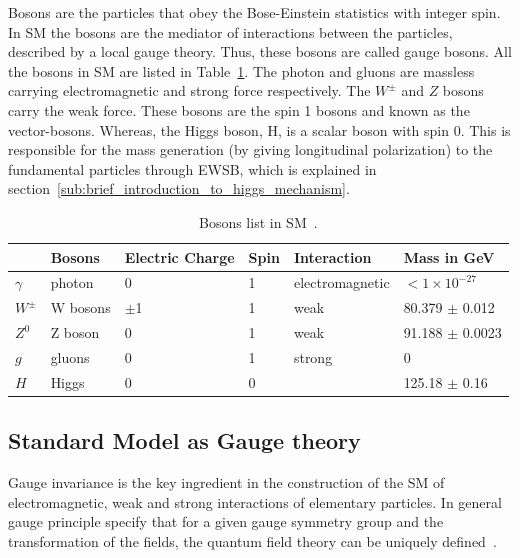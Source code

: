 Bosons are the particles that obey the Bose-Einstein statistics with integer spin. In SM the bosons are the mediator of interactions between the particles, described by a local gauge theory. Thus, these bosons are called gauge bosons. All the bosons in SM are listed in Table~\ref{table:smbosons}.
The photon and gluons are massless carrying electromagnetic and strong force respectively. The $W^{\pm}$ and $Z$ bosons carry the weak force. These bosons are the spin 1 bosons and known as the vector-bosons. Whereas, the Higgs boson, H, is a scalar boson with spin 0. This is responsible for the mass generation (by giving longitudinal polarization) to the fundamental particles through EWSB, which is explained in section~\ref{sub:brief_introduction_to_higgs_mechanism}.

\begin{table}
{\small
\centering
\begin{tabular}[!htbp]{l l l l l l}
\hline
    & \textbf{Bosons} & \textbf{Electric Charge} & \textbf{Spin} & \textbf{Interaction} & \textbf{Mass in GeV} \\
\hline
$\gamma$  & photon   & 0      & 1 & electromagnetic   &   $<1 \times 10^{-27}$ \\
$W^{\pm}$ & W bosons & $\pm$1 & 1 & weak              &  80.379 $\pm$ 0.012    \\
$Z^0$     & Z boson  & 0      & 1 & weak              &  91.188 $\pm$ 0.0023    \\
$g$       & gluons   & 0      & 1 & strong            &  0                     \\
\hline
$H$       & Higgs    & 0      & 0 &                    & 125.18 $\pm$ 0.16     \\
\hline
\end{tabular}
\caption{Bosons list in SM~\cite{PDG2018}.}
\label{table:smbosons}
}
\end{table}

\subsection{Standard Model as Gauge theory}
Gauge invariance is the key ingredient in the construction of the SM of electromagnetic, weak and strong interactions of elementary particles. In general gauge principle specify that for a given gauge symmetry group and the transformation of the fields, the quantum field theory can be uniquely defined~\cite{Coughlan2006}.

